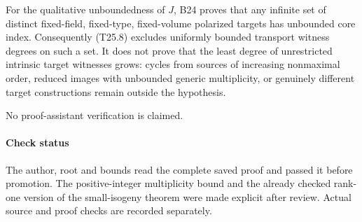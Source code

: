 For the qualitative unboundedness of \(J\), B24 proves that any infinite set of distinct fixed-field, fixed-type, fixed-volume polarized targets has unbounded core index. Consequently (T25.8) excludes uniformly bounded transport witness degrees on such a set. It does not prove that the least degree of unrestricted intrinsic target witnesses grows: cycles from sources of increasing nonmaximal order, reduced images with unbounded generic multiplicity, or genuinely different target constructions remain outside the hypothesis.

No proof-assistant verification is claimed.

\paragraph{Check status}\label{check-status-5}

The author, root and bounds read the complete saved proof and passed it before promotion. The positive-integer multiplicity bound and the already checked rank-one version of the small-isogeny theorem were made explicit after review. Actual source and proof checks are recorded separately.
